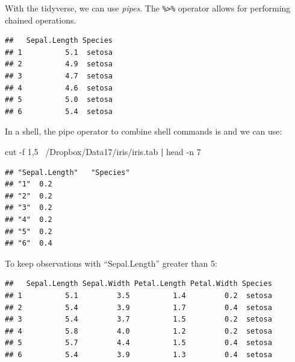 \documentclass[]{book}
\newenvironment{Shaded}{\begin{snugshade}}{\end{snugshade}}
\newcommand{\KeywordTok}[1]{\textcolor[rgb]{0.13,0.29,0.53}{\textbf{#1}}}
\newcommand{\DecValTok}[1]{\textcolor[rgb]{0.00,0.00,0.81}{#1}}
\newcommand{\StringTok}[1]{\textcolor[rgb]{0.31,0.60,0.02}{#1}}
\newcommand{\FunctionTok}[1]{\textcolor[rgb]{0.00,0.00,0.00}{#1}}
\newcommand{\OperatorTok}[1]{\textcolor[rgb]{0.81,0.36,0.00}{\textbf{#1}}}
\newcommand{\NormalTok}[1]{#1}
\theoremstyle{definition}
\theoremstyle{definition}
\theoremstyle{definition}
\theoremstyle{remark}
\begin{document}
With the tidyverse, we can use \emph{pipes}. The
\texttt{\%\textgreater{}\%} operator allows for performing chained
operations.

\begin{Shaded}
\end{Shaded}

\begin{verbatim}
##   Sepal.Length Species
## 1          5.1  setosa
## 2          4.9  setosa
## 3          4.7  setosa
## 4          4.6  setosa
## 5          5.0  setosa
## 6          5.4  setosa
\end{verbatim}

In a shell, the pipe operator to combine shell commands is
\texttt{\textbar{}} and we can use:

\begin{Shaded}
\begin{Highlighting}[]
\FunctionTok{cut}\NormalTok{ -f 1,5 ~/Dropbox/Data17/iris/iris.tab }\KeywordTok{|} \FunctionTok{head}\NormalTok{ -n 7}
\end{Highlighting}
\end{Shaded}

\begin{verbatim}
## "Sepal.Length"   "Species"
## "1"  0.2
## "2"  0.2
## "3"  0.2
## "4"  0.2
## "5"  0.2
## "6"  0.4
\end{verbatim}

To keep observations with ``Sepal.Length'' greater than 5:

\begin{Shaded}
\end{Shaded}

\begin{verbatim}
##   Sepal.Length Sepal.Width Petal.Length Petal.Width Species
## 1          5.1         3.5          1.4         0.2  setosa
## 2          5.4         3.9          1.7         0.4  setosa
## 3          5.4         3.7          1.5         0.2  setosa
## 4          5.8         4.0          1.2         0.2  setosa
## 5          5.7         4.4          1.5         0.4  setosa
## 6          5.4         3.9          1.3         0.4  setosa
\end{verbatim}
\end{document}
